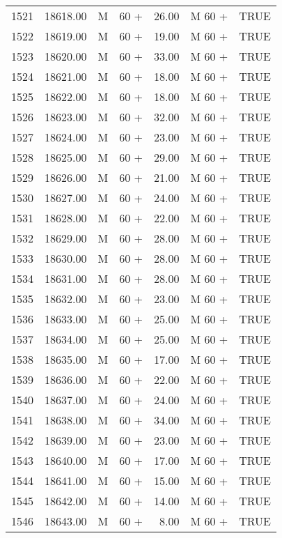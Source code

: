 \begin{table}[ht]
\begin{tabular}{rrllrll}
  1521 & 18618.00 & M & 60 + & 26.00 & M 60 + & TRUE \\ 
  1522 & 18619.00 & M & 60 + & 19.00 & M 60 + & TRUE \\ 
  1523 & 18620.00 & M & 60 + & 33.00 & M 60 + & TRUE \\ 
  1524 & 18621.00 & M & 60 + & 18.00 & M 60 + & TRUE \\ 
  1525 & 18622.00 & M & 60 + & 18.00 & M 60 + & TRUE \\ 
  1526 & 18623.00 & M & 60 + & 32.00 & M 60 + & TRUE \\ 
  1527 & 18624.00 & M & 60 + & 23.00 & M 60 + & TRUE \\ 
  1528 & 18625.00 & M & 60 + & 29.00 & M 60 + & TRUE \\ 
  1529 & 18626.00 & M & 60 + & 21.00 & M 60 + & TRUE \\ 
  1530 & 18627.00 & M & 60 + & 24.00 & M 60 + & TRUE \\ 
  1531 & 18628.00 & M & 60 + & 22.00 & M 60 + & TRUE \\ 
  1532 & 18629.00 & M & 60 + & 28.00 & M 60 + & TRUE \\ 
  1533 & 18630.00 & M & 60 + & 28.00 & M 60 + & TRUE \\ 
  1534 & 18631.00 & M & 60 + & 28.00 & M 60 + & TRUE \\ 
  1535 & 18632.00 & M & 60 + & 23.00 & M 60 + & TRUE \\ 
  1536 & 18633.00 & M & 60 + & 25.00 & M 60 + & TRUE \\ 
  1537 & 18634.00 & M & 60 + & 25.00 & M 60 + & TRUE \\ 
  1538 & 18635.00 & M & 60 + & 17.00 & M 60 + & TRUE \\ 
  1539 & 18636.00 & M & 60 + & 22.00 & M 60 + & TRUE \\ 
  1540 & 18637.00 & M & 60 + & 24.00 & M 60 + & TRUE \\ 
  1541 & 18638.00 & M & 60 + & 34.00 & M 60 + & TRUE \\ 
  1542 & 18639.00 & M & 60 + & 23.00 & M 60 + & TRUE \\ 
  1543 & 18640.00 & M & 60 + & 17.00 & M 60 + & TRUE \\ 
  1544 & 18641.00 & M & 60 + & 15.00 & M 60 + & TRUE \\ 
  1545 & 18642.00 & M & 60 + & 14.00 & M 60 + & TRUE \\ 
  1546 & 18643.00 & M & 60 + & 8.00 & M 60 + & TRUE \\ 
   \hline
\end{tabular}
\end{table}
